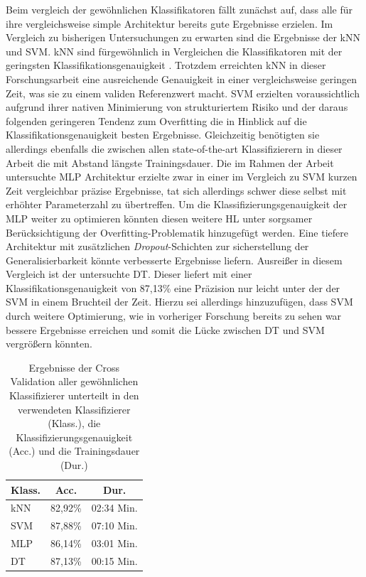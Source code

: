 Beim vergleich der gewöhnlichen Klassifikatoren fällt zunächst auf, dass alle für ihre vergleichsweise simple Architektur bereits gute Ergebnisse erzielen. Im Vergleich zu bisherigen Untersuchungen zu erwarten sind die Ergebnisse der kNN und SVM. kNN sind fürgewöhnlich in Vergleichen die Klassifikatoren mit der geringsten Klassifikationsgenauigkeit \cite{Kaufmann2013}. Trotzdem erreichten kNN in dieser Forschungsarbeit eine ausreichende Genauigkeit in einer vergleichsweise geringen Zeit, was sie zu einem validen Referenzwert macht. SVM erzielten voraussichtlich aufgrund ihrer nativen Minimierung von strukturiertem Risiko und der daraus folgenden geringeren Tendenz zum Overfitting die in Hinblick auf die Klassifikationsgenauigkeit besten Ergebnisse. Gleichzeitig benötigten sie allerdings ebenfalls die zwischen allen state-of-the-art Klassifizierern in dieser Arbeit die mit Abstand längste Trainingsdauer. Die im Rahmen der Arbeit untersuchte MLP Architektur erzielte zwar in einer im Vergleich zu SVM kurzen Zeit vergleichbar präzise Ergebnisse, tat sich allerdings schwer diese selbst mit erhöhter Parameterzahl zu übertreffen. Um die Klassifizierungsgenauigkeit der MLP weiter zu optimieren könnten diesen weitere HL unter sorgsamer Berücksichtigung der Overfitting-Problematik hinzugefügt werden. Eine tiefere Architektur mit zusätzlichen \textit{Dropout}-Schichten zur sicherstellung der Generalisierbarkeit könnte verbesserte Ergebnisse liefern. Ausreißer in diesem Vergleich ist der untersuchte DT. Dieser liefert mit einer Klassifikationsgenauigkeit von 87,13\% eine Präzision nur leicht unter der der SVM in einem Bruchteil der Zeit. Hierzu sei allerdings hinzuzufügen, dass SVM durch weitere Optimierung, wie in vorheriger Forschung bereits zu sehen war \cite{Kaufmann2013} bessere Ergebnisse erreichen und somit die Lücke zwischen DT und SVM vergrößern könnten. 

    \begin{table}[h]
        \centering
        \begin{tabular}{| l | c | c |}
            \hline
            \textbf{Klass.} & \textbf{Acc.} & \textbf{Dur.} \\
            \hline
            kNN & 82,92\% & 02:34 Min.\\ \hline
            SVM & 87,88\% & 07:10 Min.\\ \hline
            MLP & 86,14\% & 03:01 Min.\\ \hline
            DT & 87,13\% & 00:15 Min.\\
            \hline
        \end{tabular}
        \caption{Ergebnisse der Cross Validation aller gewöhnlichen Klassifizierer unterteilt in den verwendeten Klassifizierer (Klass.), die Klassifizierungsgenauigkeit (Acc.) und die Trainingsdauer (Dur.)}
        \label{tab:other-classifiers-comp}
    \end{table}

